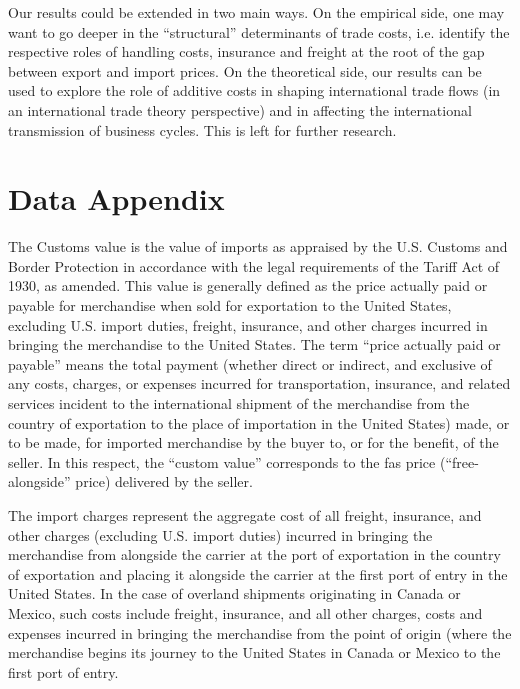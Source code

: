 \documentclass[a4paper,11pt]{article}
\begin{document}
Our results could be extended in two main ways. On the empirical side, one may want to go deeper in the ``structural'' determinants of trade costs, i.e. identify the respective roles of handling costs, insurance and freight at the root of the gap between export and import prices. On the theoretical side, our results can be used to explore the role of additive costs in shaping international trade flows (in an international trade theory perspective) and in affecting the international transmission of business cycles. This is left for further research.



\newpage




\newpage


\appendix

\section{Data Appendix \label{app:data}}


The Customs value is the value of imports as appraised by the U.S. Customs and Border Protection in accordance with the legal requirements of the Tariff Act of 1930, as amended. This value is generally defined as the price actually paid or payable for merchandise when sold for exportation to the United States, excluding U.S. import duties, freight, insurance, and other charges incurred in bringing the merchandise to the United States. The term ``price actually paid or payable'' means the total payment (whether direct or indirect, and exclusive of any costs, charges, or expenses incurred for transportation, insurance, and related services incident to the international shipment of the merchandise from the country of exportation to the place of importation in the United States) made, or to be made, for imported merchandise by the buyer to, or for the benefit, of the seller. In this respect, the ``custom value'' corresponds to the fas price (``free-alongside'' price) delivered by the seller.

The import charges represent the aggregate cost of all freight, insurance, and other charges (excluding U.S. import duties) incurred in bringing the merchandise from alongside the carrier at the port of exportation in the country of exportation and placing it alongside the carrier at the first port of entry in the United States. In the case of overland shipments originating in Canada or Mexico, such costs include freight, insurance, and all other charges, costs and expenses incurred in bringing the merchandise from the point of origin (where the merchandise begins its journey to the United States in Canada or Mexico to the first port of entry.
\end{document}
